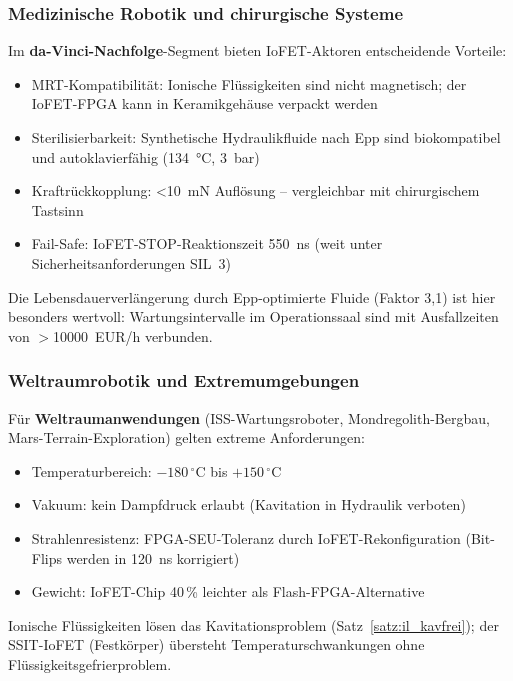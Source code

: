 ﻿\documentclass[a4paper,12pt]{scrreprt}
\theoremstyle{definition}
\begin{document}
\subsubsection{Medizinische Robotik und chirurgische Systeme}

Im \textbf{da-Vinci-Nachfolge}-Segment bieten IoFET-Aktoren entscheidende
Vorteile:
\begin{itemize}
  \item MRT-Kompatibilität: Ionische Flüssigkeiten sind nicht magnetisch;
        der IoFET-FPGA kann in Keramikgehäuse verpackt werden
  \item Sterilisierbarkeit: Synthetische Hydraulikfluide nach Epp sind
        biokompatibel und autoklavierfähig (\SI{134}{\celsius}, \SI{3}{\bar})
  \item Kraftrückkopplung: \SI{<10}{\milli\newton} Auflösung --
        vergleichbar mit chirurgischem Tastsinn
  \item Fail-Safe: IoFET-STOP-Reaktionszeit \SI{550}{\nano\second}
        (weit unter Sicherheitsanforderungen SIL~3)
\end{itemize}
Die Lebensdauerverlängerung durch Epp-optimierte Fluide (Faktor 3,1)
ist hier besonders wertvoll: Wartungsintervalle im Operationssaal
sind mit Ausfallzeiten von $>$\num{10000}~EUR/h verbunden.

\subsubsection{Weltraumrobotik und Extremumgebungen}

Für \textbf{Weltraumanwendungen} (ISS-Wartungsroboter, Mondregolith-Bergbau,
Mars-Terrain-Exploration) gelten extreme Anforderungen:
\begin{itemize}
  \item Temperaturbereich: $-180\,{}^{\circ}\text{C}$ bis $+150\,{}^{\circ}\text{C}$
  \item Vakuum: kein Dampfdruck erlaubt (Kavitation in Hydraulik verboten)
  \item Strahlenresistenz: FPGA-SEU-Toleranz durch IoFET-Rekonfiguration
        (Bit-Flips werden in \SI{120}{\nano\second} korrigiert)
  \item Gewicht: IoFET-Chip 40\,\% leichter als Flash-FPGA-Alternative
\end{itemize}
Ionische Flüssigkeiten lösen das Kavitationsproblem (Satz~\ref{satz:il_kavfrei});
der SSIT-IoFET (Festkörper) übersteht Temperaturschwankungen ohne
Flüssigkeitsgefrierproblem.
\end{document}
